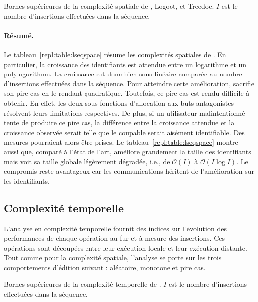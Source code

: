 \begin{table}
  \begin{center}
    \caption[Bornes supérieures de la complexité spatiale de \LSEQ, Logoot, et
    Treedoc] {\label{repl:table:lseqspace} Bornes supérieures de la complexité
      spatiale de \LSEQ, Logoot, et Treedoc. $I$ est le nombre d'insertions
      effectuées dans la séquence.}
    
  \end{center}
\end{table}

\paragraph{Résumé.} Le tableau~\ref{repl:table:lseqspace} résume les complexités
spatiales de \LSEQ. En particulier, la croissance des identifiants est attendue
entre un logarithme et un polylogarithme. La croissance est donc bien
sous-linéaire comparée au nombre d'insertions effectuées dans la séquence. Pour
atteindre cette amélioration, \LSEQ sacrifie son pire cas en le rendant
quadratique. Toutefois, ce pire cas est rendu difficile à obtenir. En effet, les
deux sous-fonctions d'allocation aux buts antagonistes résolvent leurs
limitations respectives. De plus, si un utilisateur malintentionné tente de
produire ce pire cas, la différence entre la croissance attendue et la
croissance observée serait telle que le coupable serait aisément
identifiable. Des mesures pourraient alors être prises. Le
tableau~\ref{repl:table:lseqspace} montre aussi que, comparé à l'état de l'art,
\LSEQ améliore grandement la taille des identifiants mais voit sa taille globale
légèrement dégradée, i.e., de $\mathcal{O}(I)$ à $\mathcal{O}(I\log I)$. Le
compromis reste avantageux car les communications héritent de l'amélioration sur
les identifiants.

\subsection{Complexité temporelle}

L'analyse en complexité temporelle fournit des indices sur l'évolution des
performances de chaque opération au fur et à mesure des insertions. Ces
opérations sont découpées entre leur exécution locale et leur exécution
distante. Tout comme pour la complexité spatiale, l'analyse se porte sur les
trois comportements d'édition suivant : aléatoire, monotone et pire cas.

\begin{table}
  \begin{center}
    \caption[Bornes supérieures de la complexité temporelle de \LSEQ]
    {\label{repl:table:lseqtime} Bornes supérieures de la complexité temporelle
      de \LSEQ. $I$ est le nombre d'insertions effectuées dans la séquence.}
    
  \end{center}
\end{table}


